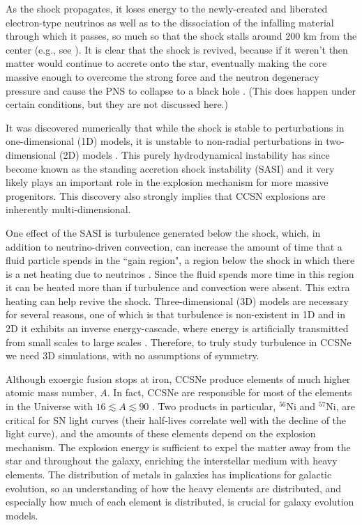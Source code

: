 As the shock propagates, it loses energy to the newly-created and liberated
electron-type neutrinos as well as to the dissociation of the
infalling material through which it passes,
so much so that the shock stalls around 200 km from the center
(e.g., see \citet{hm1981}).
It is clear that the shock is revived, because if it weren't then matter
would continue to accrete onto the star, eventually making the core massive
enough to overcome the strong force and the neutron degeneracy pressure
and cause the PNS to collapse
to a black hole \citep{bw1985}.
(This does happen under certain conditions, but they are not discussed here.)

It was discovered numerically that while the shock is stable to
perturbations in one-dimensional (1D) models,
it is unstable to non-radial perturbations
in two-dimensional (2D) models \citep{bmd2003}.
This purely hydrodynamical instability has since become known as the
standing accretion shock instability (SASI) and it very likely plays an
important role in the explosion mechanism for more massive progenitors.
This discovery also strongly implies that CCSN explosions are
inherently multi-dimensional.

One effect of the SASI is turbulence generated below the shock,
which, in addition to neutrino-driven convection,
can increase the amount of time that a fluid particle spends
in the ``gain region", a region below the shock in which there is a
net heating due to neutrinos \citep{co2015}.
Since the fluid spends more time in this region it can be heated more than if
turbulence and convection were absent.
This extra heating can help revive the shock.
Three-dimensional (3D) models are necessary for several reasons,
one of which is that turbulence is non-existent in 1D and in 2D it
exhibits an inverse energy-cascade, where energy is artificially transmitted
from small scales to large scales \citep{yem2017}.
Therefore, to truly study turbulence in CCSNe we need 3D simulations,
with no assumptions of symmetry.

Although exoergic fusion stops at iron,
CCSNe produce elements of much higher atomic mass number, $A$.
In fact, CCSNe are responsible for most of the elements in the Universe with
$16\lesssim A\lesssim90$ \citep{bw2017}.
Two products in particular, $^{56}$Ni and $^{57}$Ni, are critical for SN light
curves (their half-lives correlate well with the decline of the light curve),
and the amounts of these elements depend on the explosion mechanism.
The explosion energy is sufficient to expel the matter away from the star
and throughout the galaxy, enriching the interstellar medium with heavy
elements.
The distribution of metals in galaxies has implications for galactic
evolution, so an understanding of how the heavy elements are distributed,
and especially how much of each element is distributed,
is crucial for galaxy evolution models.

